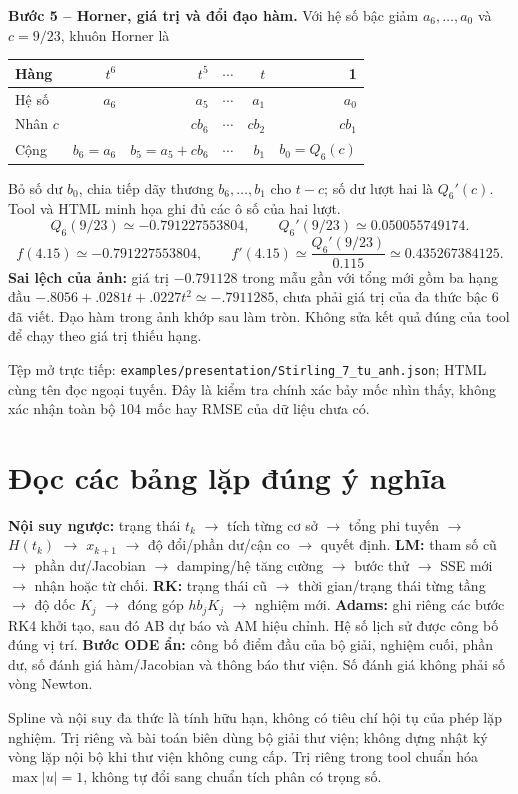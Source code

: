 \textbf{Bước 5 -- Horner, giá trị và đổi đạo hàm.}
Với hệ số bậc giảm $a_6,\ldots,a_0$ và $c=9/23$, khuôn Horner là
\begin{center}\small
\begin{tabular}{lrrrrr}\toprule
Hàng&$t^6$&$t^5$&$\cdots$&$t$&1\\\midrule
Hệ số&$a_6$&$a_5$&$\cdots$&$a_1$&$a_0$\\
Nhân $c$&&$cb_6$&$\cdots$&$cb_2$&$cb_1$\\
Cộng&$b_6=a_6$&$b_5=a_5+cb_6$&$\cdots$&$b_1$&$b_0=Q_6(c)$\\\bottomrule
\end{tabular}\end{center}
Bỏ số dư $b_0$, chia tiếp dãy thương $b_6,\ldots,b_1$ cho $t-c$;
số dư lượt hai là $Q_6'(c)$. Tool và HTML minh họa ghi đủ các ô số của hai lượt.
\[
Q_6(9/23)\simeq-0.791227553804,\qquad
Q_6'(9/23)\simeq0.050055749174.
\]
\[
f(4.15)\simeq-0.791227553804,\qquad
f'(4.15)\simeq\frac{Q_6'(9/23)}{0.115}\simeq0.435267384125.
\]
\textbf{Sai lệch của ảnh:} giá trị $-0.791128$ trong mẫu gần với tổng mới gồm ba hạng đầu
$-.8056+.0281t+.0227t^2\simeq-.7911285$, chưa phải giá trị của đa thức bậc 6 đã viết.
Đạo hàm trong ảnh khớp sau làm tròn. Không sửa kết quả đúng của tool để chạy theo giá trị thiếu hạng.

Tệp mở trực tiếp: \texttt{examples/presentation/Stirling\_7\_tu\_anh.json};
HTML cùng tên đọc ngoại tuyến. Đây là kiểm tra chính xác bảy mốc nhìn thấy, không xác nhận toàn bộ 104 mốc hay RMSE của dữ liệu chưa có.

\section{Đọc các bảng lặp đúng ý nghĩa}
\textbf{Nội suy ngược:} trạng thái $t_k$ $\to$ tích từng cơ sở $\to$ tổng phi tuyến $\to$ $H(t_k)$ $\to$ $x_{k+1}$ $\to$ độ đổi/phần dư/cận co $\to$ quyết định.
\textbf{LM:} tham số cũ $\to$ phần dư/Jacobian $\to$ damping/hệ tăng cường $\to$ bước thử $\to$ SSE mới $\to$ nhận hoặc từ chối.
\textbf{RK:} trạng thái cũ $\to$ thời gian/trạng thái từng tầng $\to$ độ dốc $K_j$ $\to$ đóng góp $hb_jK_j$ $\to$ nghiệm mới.
\textbf{Adams:} ghi riêng các bước RK4 khởi tạo, sau đó AB dự báo và AM hiệu chỉnh. Hệ số lịch sử được công bố đúng vị trí.
\textbf{Bước ODE ẩn:} công bố điểm đầu của bộ giải, nghiệm cuối, phần dư, số đánh giá hàm/Jacobian và thông báo thư viện. Số đánh giá không phải số vòng Newton.

Spline và nội suy đa thức là tính hữu hạn, không có tiêu chí hội tụ của phép lặp nghiệm.
Trị riêng và bài toán biên dùng bộ giải thư viện; không dựng nhật ký vòng lặp nội bộ khi thư viện không cung cấp.
Trị riêng trong tool chuẩn hóa $\max|u|=1$, không tự đổi sang chuẩn tích phân có trọng số.


